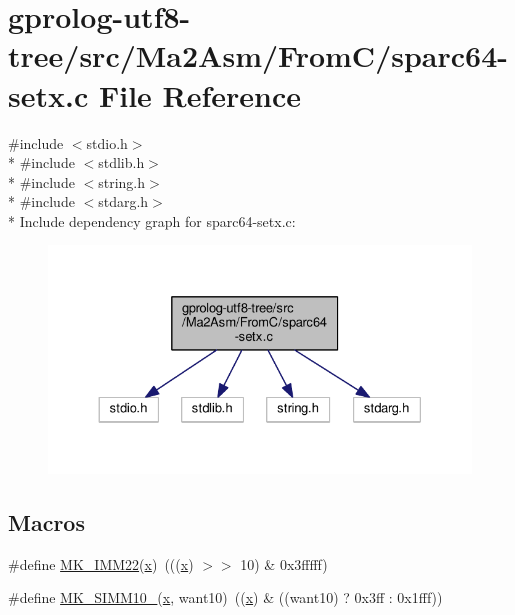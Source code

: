 \hypertarget{sparc64-setx_8c}{}\section{gprolog-\/utf8-\/tree/src/\+Ma2\+Asm/\+From\+C/sparc64-\/setx.c File Reference}
\label{sparc64-setx_8c}
{\ttfamily \#include $<$stdio.\+h$>$}\\*
{\ttfamily \#include $<$stdlib.\+h$>$}\\*
{\ttfamily \#include $<$string.\+h$>$}\\*
{\ttfamily \#include $<$stdarg.\+h$>$}\\*
Include dependency graph for sparc64-\/setx.c\+:
\nopagebreak
\begin{figure}[H]
\begin{center}
\leavevmode
\includegraphics[width=330pt]{sparc64-setx_8c__incl}
\end{center}
\end{figure}
\subsection*{Macros}
\begin{DoxyCompactItemize}
\item 
\#define \hyperlink{sparc64-setx_8c_a81a9e6ad68024dc29dcea31c3497dbca}{M\+K\+\_\+\+I\+M\+M22}(\hyperlink{asm__inst_8c_a6150e0515f7202e2fb518f7206ed97dc}{x})~(((\hyperlink{asm__inst_8c_a6150e0515f7202e2fb518f7206ed97dc}{x}) $>$$>$ 10) \& 0x3fffff)
\item 
\#define \hyperlink{sparc64-setx_8c_a59b653166cf9be443d113abcfa3fc195}{M\+K\+\_\+\+S\+I\+M\+M10\+\_}(\hyperlink{asm__inst_8c_a6150e0515f7202e2fb518f7206ed97dc}{x},  want10)~((\hyperlink{asm__inst_8c_a6150e0515f7202e2fb518f7206ed97dc}{x}) \& ((want10) ?  0x3ff \+: 0x1fff))
\end{DoxyCompactItemize}

